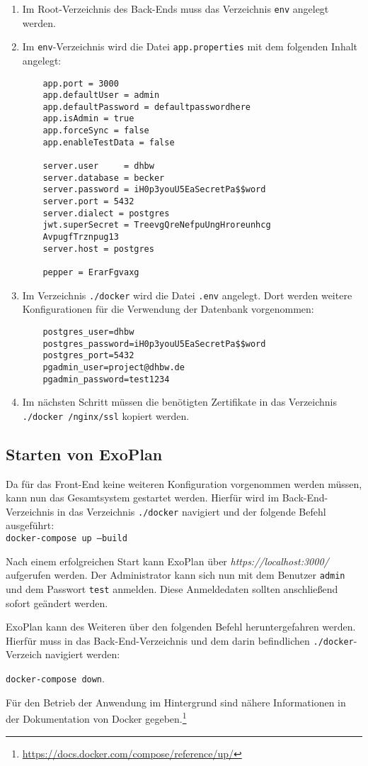 \begin{enumerate}
	\item Im Root-Verzeichnis des Back-Ends muss das Verzeichnis \texttt{env} angelegt werden.
	\item Im \texttt{env}-Verzeichnis wird die Datei \texttt{app.properties} mit dem folgenden Inhalt angelegt:
	\begin{lstlisting}
	app.port = 3000
	app.defaultUser = admin
	app.defaultPassword = defaultpasswordhere
	app.isAdmin = true
	app.forceSync = false
	app.enableTestData = false
	
	server.user     = dhbw
	server.database = becker
	server.password = iH0p3youU5EaSecretPa$$word
	server.port = 5432
	server.dialect = postgres
	jwt.superSecret = TreevgQreNefpuUngHroreunhcg
	AvpugfTrznpug13
	server.host = postgres
	
	pepper = ErarFgvaxg
	\end{lstlisting}
	
	\item Im Verzeichnis \texttt{./docker} wird die Datei \texttt{.env} angelegt. Dort werden weitere Konfigurationen für die Verwendung der Datenbank vorgenommen:
	
	\begin{lstlisting}
	postgres_user=dhbw
	postgres_password=iH0p3youU5EaSecretPa$$word
	postgres_port=5432
	pgadmin_user=project@dhbw.de
	pgadmin_password=test1234
	\end{lstlisting}
	
	\item Im nächsten Schritt müssen die benötigten Zertifikate in das Verzeichnis \texttt{./docker
		/nginx/ssl} kopiert werden.
	
\end{enumerate}

\subsection{Starten von ExoPlan}

Da für das Front-End keine weiteren Konfiguration vorgenommen werden müssen, kann nun das Gesamtsystem gestartet werden. 
Hierfür wird im Back-End-Verzeichnis in das Verzeichnis \texttt{./docker} navigiert und der folgende Befehl ausgeführt:\\ 
\texttt{docker-compose up --build}

Nach einem erfolgreichen Start kann ExoPlan über \textit{https://localhost:3000/} aufgerufen werden. 
Der Administrator kann sich nun mit dem Benutzer \texttt{admin} und dem Passwort \texttt{test} anmelden. Diese Anmeldedaten sollten anschließend sofort geändert werden.

ExoPlan kann des Weiteren über den folgenden Befehl heruntergefahren werden. 
Hierfür muss in das Back-End-Verzeichnis und dem darin befindlichen \texttt{./docker}-Verzeich navigiert werden:

\texttt{docker-compose down}.

Für den Betrieb der Anwendung im Hintergrund sind nähere Informationen in der Dokumentation von Docker gegeben.\footnote{\url{https://docs.docker.com/compose/reference/up/}}
